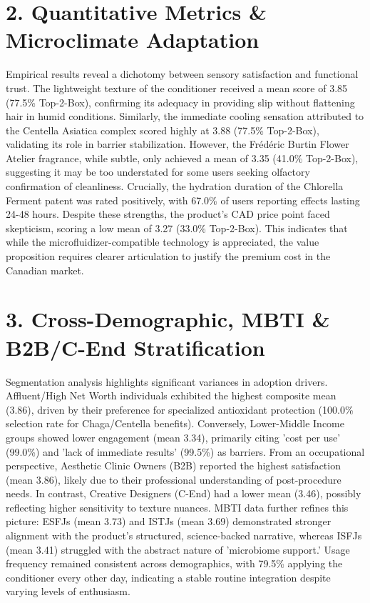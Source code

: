 \documentclass[10pt,twocolumn,a4paper]{article}
\begin{document}
\section{2. Quantitative Metrics \& Microclimate Adaptation}
Empirical results reveal a dichotomy between sensory satisfaction and functional trust. The lightweight texture of the conditioner received a mean score of 3.85 (77.5\% Top-2-Box), confirming its adequacy in providing slip without flattening hair in humid conditions. Similarly, the immediate cooling sensation attributed to the Centella Asiatica complex scored highly at 3.88 (77.5\% Top-2-Box), validating its role in barrier stabilization. However, the Frédéric Burtin Flower Atelier fragrance, while subtle, only achieved a mean of 3.35 (41.0\% Top-2-Box), suggesting it may be too understated for some users seeking olfactory confirmation of cleanliness. Crucially, the hydration duration of the Chlorella Ferment patent was rated positively, with 67.0\% of users reporting effects lasting 24-48 hours. Despite these strengths, the product's CAD price point faced skepticism, scoring a low mean of 3.27 (33.0\% Top-2-Box). This indicates that while the microfluidizer-compatible technology is appreciated, the value proposition requires clearer articulation to justify the premium cost in the Canadian market.
\section{3. Cross-Demographic, MBTI \& B2B/C-End Stratification}
Segmentation analysis highlights significant variances in adoption drivers. Affluent/High Net Worth individuals exhibited the highest composite mean (3.86), driven by their preference for specialized antioxidant protection (100.0\% selection rate for Chaga/Centella benefits). Conversely, Lower-Middle Income groups showed lower engagement (mean 3.34), primarily citing 'cost per use' (99.0\%) and 'lack of immediate results' (99.5\%) as barriers. From an occupational perspective, Aesthetic Clinic Owners (B2B) reported the highest satisfaction (mean 3.86), likely due to their professional understanding of post-procedure needs. In contrast, Creative Designers (C-End) had a lower mean (3.46), possibly reflecting higher sensitivity to texture nuances. MBTI data further refines this picture: ESFJs (mean 3.73) and ISTJs (mean 3.69) demonstrated stronger alignment with the product's structured, science-backed narrative, whereas ISFJs (mean 3.41) struggled with the abstract nature of 'microbiome support.' Usage frequency remained consistent across demographics, with 79.5\% applying the conditioner every other day, indicating a stable routine integration despite varying levels of enthusiasm.
\end{document}
